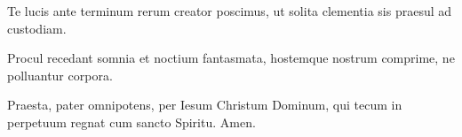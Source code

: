Te lucis ante terminum
rerum creator poscimus,
ut solita clementia
sis praesul ad custodiam.

Procul recedant somnia
et noctium fantasmata,
hostemque nostrum comprime,
ne polluantur corpora.

Praesta, pater omnipotens,
per Iesum Christum Dominum,
qui tecum in perpetuum
regnat cum sancto Spiritu.
Amen.
